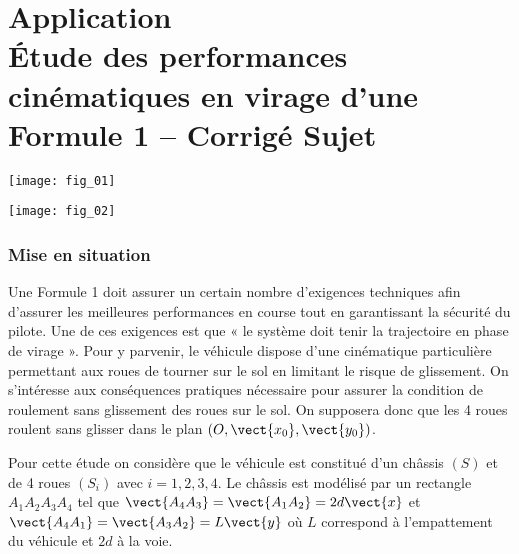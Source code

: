 \chapter*{Application  \\ 
Étude des performances cinématiques en virage d’une Formule 1 -- \ifprof Corrigé \else Sujet \fi}

\iflivret {} \else
\ifprof  {} \else \fi
\fi

\setcounter{question}{0}

\marginnote[1cm]{
}


\begin{marginfigure}
\texttt{[image: fig\_01]}
\end{marginfigure}




\begin{center}
\texttt{[image: fig\_02]}
\end{center}



\subsection*{Mise en situation}
Une Formule 1 doit assurer un certain nombre d’exigences techniques afin d’assurer les meilleures performances en course tout en garantissant la sécurité du pilote. Une de ces exigences est que « le système doit tenir la trajectoire en phase de virage ». Pour y parvenir, le véhicule dispose d'une cinématique particulière permettant aux roues de tourner sur le sol en limitant le risque de glissement. On s'intéresse aux conséquences pratiques nécessaire pour assurer la condition de roulement sans glissement des roues sur le sol. On supposera donc que les 4 roues roulent sans glisser dans le plan
$\left(O,\vect{x_0},\vect{y_0}\right)$. 


Pour cette étude on considère que le véhicule est constitué d’un châssis \textbf{$(S)$} et de 4 roues \textbf{$(S_i)$}
 avec $i=1,2,3,4$.  Le châssis est modélisé par un rectangle $A_1A_2A_3A_4$ tel que 
 $\vect{A_4 A_3}=\vect{A_1 A_2}=2d\vect{x}$ et $\vect{A_4 A_1}=\vect{A_3 A_2}=L\vect{y}$  où $L$ correspond à l’empattement du véhicule et $2d$ à la voie. 


